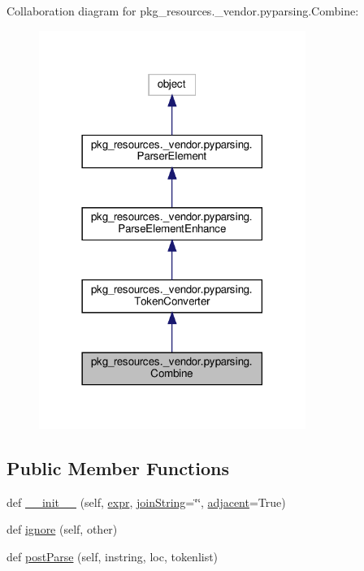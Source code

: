 Collaboration diagram for pkg\+\_\+resources.\+\_\+vendor.\+pyparsing.\+Combine\+:
\nopagebreak
\begin{figure}[H]
\begin{center}
\leavevmode
\includegraphics[width=246pt]{classpkg__resources_1_1__vendor_1_1pyparsing_1_1Combine__coll__graph}
\end{center}
\end{figure}
\subsection*{Public Member Functions}
\begin{DoxyCompactItemize}
\item 
def \hyperlink{classpkg__resources_1_1__vendor_1_1pyparsing_1_1Combine_ac486d333729481aca8d159b774785864}{\+\_\+\+\_\+init\+\_\+\+\_\+} (self, \hyperlink{classpkg__resources_1_1__vendor_1_1pyparsing_1_1ParseElementEnhance_a34e02b3404b2a545ca1be8b522758896}{expr}, \hyperlink{classpkg__resources_1_1__vendor_1_1pyparsing_1_1Combine_a1221cf58a85aadbcb96b25fcdc2ff505}{join\+String}=\char`\"{}\char`\"{}, \hyperlink{classpkg__resources_1_1__vendor_1_1pyparsing_1_1Combine_a0e0abea5e887aee659e6bde5492dc299}{adjacent}=True)
\item 
def \hyperlink{classpkg__resources_1_1__vendor_1_1pyparsing_1_1Combine_a201aab275db8da28248836cd7b06051b}{ignore} (self, other)
\item 
def \hyperlink{classpkg__resources_1_1__vendor_1_1pyparsing_1_1Combine_ac14783e106dea5800c9ac3b3dcb58c02}{post\+Parse} (self, instring, loc, tokenlist)
\end{DoxyCompactItemize}
